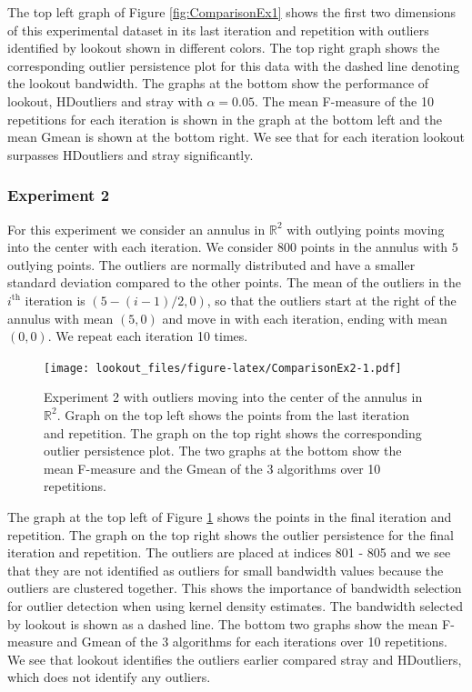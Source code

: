 \documentclass[11pt,a4paper,]{article}
\theoremstyle{definition}
\theoremstyle{definition}
\theoremstyle{definition}
\theoremstyle{remark}
\begin{document}
The top left graph of Figure \ref{fig:ComparisonEx1} shows the first two dimensions of this experimental dataset in its last iteration and repetition with outliers identified by lookout shown in different colors. The top right graph shows the corresponding outlier persistence plot for this data with the dashed line denoting the lookout bandwidth. The graphs at the bottom show the performance of lookout, HDoutliers and stray with \(\alpha = 0.05\). The mean F-measure of the 10 repetitions for each iteration is shown in the graph at the bottom left and the mean Gmean is shown at the bottom right. We see that for each iteration lookout surpasses HDoutliers and stray significantly.

\hypertarget{sec:exp2}{%
\subsubsection{Experiment 2}\label{sec:exp2}}

For this experiment we consider an annulus in \(\mathbb{R}^2\) with outlying points moving into the center with each iteration. We consider \(800\) points in the annulus with \(5\) outlying points. The outliers are normally distributed and have a smaller standard deviation compared to the other points. The mean of the outliers in the \(i^{\text{th}}\) iteration is \(\left( 5 - (i-1) /2, 0 \right)\), so that the outliers start at the right of the annulus with mean \((5,0)\) and move in with each iteration, ending with mean \((0,0)\). We repeat each iteration 10 times.

\begin{figure}
\centering
\texttt{[image: lookout\_files/figure-latex/ComparisonEx2-1.pdf]}
\caption{\label{fig:ComparisonEx2}Experiment 2 with outliers moving into the center of the annulus in \(\mathbb{R}^2\). Graph on the top left shows the points from the last iteration and repetition. The graph on the top right shows the corresponding outlier persistence plot. The two graphs at the bottom show the mean F-measure and the Gmean of the 3 algorithms over 10 repetitions.}
\end{figure}

The graph at the top left of Figure \ref{fig:ComparisonEx2} shows the points in the final iteration and repetition. The graph on the top right shows the outlier persistence for the final iteration and repetition. The outliers are placed at indices 801 - 805 and we see that they are not identified as outliers for small bandwidth values because the outliers are clustered together. This shows the importance of bandwidth selection for outlier detection when using kernel density estimates. The bandwidth selected by lookout is shown as a dashed line. The bottom two graphs show the mean F-measure and Gmean of the 3 algorithms for each iterations over 10 repetitions. We see that lookout identifies the outliers earlier compared stray and HDoutliers, which does not identify any outliers.
\end{document}

